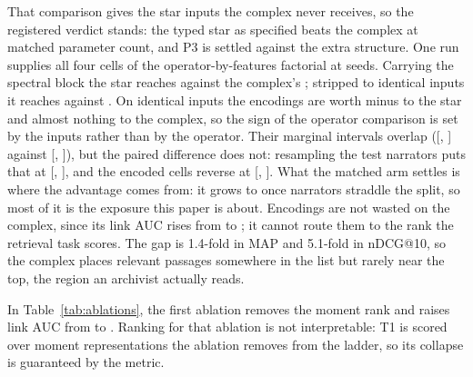 \documentclass[conference]{IEEEtran}
\begin{document}
That comparison gives the star inputs the complex never receives, so the registered verdict
stands: the typed star as specified beats the complex at matched parameter
count, and P3 is settled against the extra structure. One run supplies all four cells of the
operator-by-features factorial at \facSeeds{} seeds. Carrying the spectral block the star
reaches \facThreeEnc{} against the complex's \facFiveEnc{}; stripped to identical inputs it
reaches \facThreePlain{} against \facFivePlain{}. On identical inputs the encodings are
worth
\facThreeEnc{} minus \facThreePlain{} to the star and almost nothing to the complex, so the
sign of the operator comparison is set by the inputs rather than by the operator. Their
marginal intervals overlap ([\facThreePlainLo{}, \facThreePlainHi{}] against
[\facFivePlainLo{}, \facFivePlainHi{}]), but the paired difference does not: resampling the
\facNarrDisj{} test narrators puts that \facOpPlainDisj{} at [\facOpPlainDisjLo{},
\facOpPlainDisjHi{}], and the encoded cells reverse at [\facOpEncDisjLo{},
\facOpEncDisjHi{}]. What the matched arm settles is where
the advantage comes from: it grows to \facOpPlainRand{} once narrators straddle the split, so
most of it is the exposure this paper is about. Encodings are not wasted on the complex,
since
its link AUC rises from \facFivePlainAuc{} to \facFiveEncAuc{}; it cannot route them to the
rank the retrieval task scores. The gap is 1.4-fold in MAP and 5.1-fold in nDCG@10, so the
complex places relevant
passages somewhere in the list but rarely near the top, the region an archivist actually reads.

\begin{table}[t]\centering
\caption{A lossless star expansion is the stronger ranker at matched parameter count.
Primary cell: mid granularity, narrator-disjoint split, mixed negative sampling, rank map
R-A; means over \nSeeds{} seeds at matched parameter budget.}
\label{tab:models}
{\footnotesize}\end{table}

In Table~\ref{tab:ablations}, the first ablation removes the moment rank and raises link AUC
from \MfiveTtwo{} to \ablationNoMomentsTwo{}. Ranking for that ablation is not interpretable:
T1 is scored over moment representations the ablation removes from the ladder, so its
collapse is guaranteed by the metric.
\end{document}
